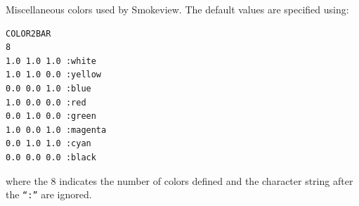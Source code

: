 \documentclass[11pt,twoside]{book}
\newcommand{\hitem}[1]{\item[{\bf #1} \hfill]}
\begin{document}
\hitem{COLOR2BAR} Miscellaneous colors used by Smokeview.  The
default values are specified using:
\begin{lstlisting}
COLOR2BAR
8
1.0 1.0 1.0 :white
1.0 1.0 0.0 :yellow
0.0 0.0 1.0 :blue
1.0 0.0 0.0 :red
0.0 1.0 0.0 :green
1.0 0.0 1.0 :magenta
0.0 1.0 1.0 :cyan
0.0 0.0 0.0 :black
\end{lstlisting}

\noindent where the 8 indicates the number of colors defined and
the character string after the {\tt ``:''} are ignored.

%
%
%
%
\end{document}
